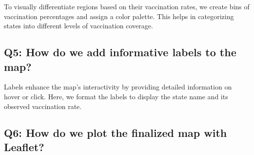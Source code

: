 \documentclass[
]{book}
\newenvironment{Shaded}{\begin{snugshade}}{\end{snugshade}}
\newcommand{\AttributeTok}[1]{\textcolor[rgb]{0.13,0.29,0.53}{#1}}
\newcommand{\DecValTok}[1]{\textcolor[rgb]{0.00,0.00,0.81}{#1}}
\newcommand{\FunctionTok}[1]{\textcolor[rgb]{0.13,0.29,0.53}{\textbf{#1}}}
\newcommand{\NormalTok}[1]{#1}
\newcommand{\OtherTok}[1]{\textcolor[rgb]{0.56,0.35,0.01}{#1}}
\newcommand{\SpecialCharTok}[1]{\textcolor[rgb]{0.81,0.36,0.00}{\textbf{#1}}}
\newcommand{\StringTok}[1]{\textcolor[rgb]{0.31,0.60,0.02}{#1}}
\begin{document}
To visually differentiate regions based on their vaccination rates, we create bins of vaccination percentages and assign a color palette. This helps in categorizing states into different levels of vaccination coverage.

\begin{Shaded}
\end{Shaded}

\hypertarget{q5-how-do-we-add-informative-labels-to-the-map}{%
\subsection{Q5: How do we add informative labels to the map?}\label{q5-how-do-we-add-informative-labels-to-the-map}}

Labels enhance the map's interactivity by providing detailed information on hover or click. Here, we format the labels to display the state name and its observed vaccination rate.

\begin{Shaded}
\end{Shaded}

\hypertarget{q6-how-do-we-plot-the-finalized-map-with-leaflet}{%
\subsection{Q6: How do we plot the finalized map with Leaflet?}\label{q6-how-do-we-plot-the-finalized-map-with-leaflet}}
\end{document}

